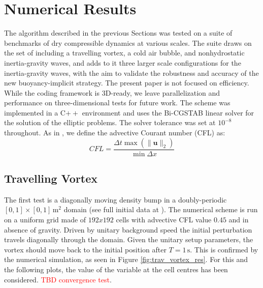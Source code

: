 \documentclass{ametsoc}
\theoremstyle{definition}
\newcommand{\benacchio}[1]{\textcolor{red}{#1}}
\begin{document}

\section{Numerical Results}
\label{sec:Results}

The algorithm described in the previous Sections was tested on a suite of benchmarks of dry compressible dynamics at various scales. The suite draws on the set of \cite{Benacchio2014,BenacchioEtAl2014} including a travelling vortex, a cold air bubble, and nonhydrostatic inertia-gravity waves, and adds to it three larger scale configurations for the inertia-gravity waves, with the aim to validate the robustness and accuracy of the new buoyancy-implicit strategy. The present paper is not focused on efficiency. While the coding framework is 3D-ready, we leave parallelization and performance on three-dimensional tests for future work. The scheme was implemented in a C$++$ environment and uses the Bi-CGSTAB linear solver \citep{Vandervorst1992} for the solution of the elliptic problems. The solver tolerance was set at $10^{-8}$ throughout. As in \cite{BenacchioEtAl2014}, we define the advective Courant number (CFL) as:
%
\begin{equation}
 CFL=\dfrac{\Delta t \max(\|\mathbf{u}\|_2)}{\min{\Delta x}}
\end{equation}
%

\subsection{Travelling Vortex}

The first test is a diagonally moving density bump in a doubly-periodic $[0,1]\times[0,1]\,\textrm{m}^2$ domain (see full initial data at \cite{KadiogluEtAl2008}). The numerical scheme is run on a uniform grid made of $192x192$ cells with advective CFL value $0.45$ and in absence of gravity. Driven by unitary background speed the initial perturbation travels diagonally through the domain. Given the unitary setup parameters, the vortex should move back to the initial position after $T=1\,\textrm{s}$. This is confirmed by the numerical simulation, as seen in Figure \ref{fig:trav_vortex_res}. For this and the following plots, the value of the variable at the cell centres has been considered. \benacchio{TBD convergence test}.
\end{document}

